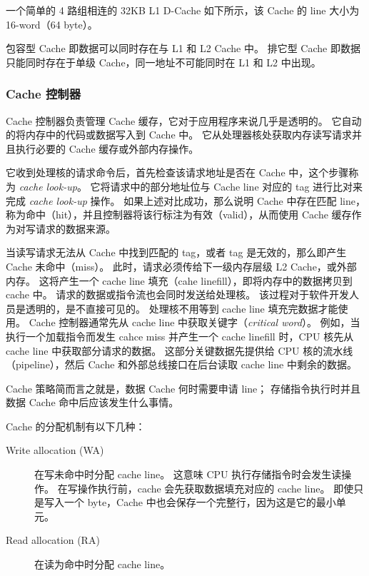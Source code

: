 一个简单的 4 路组相连的 32KB L1 D-Cache 如下所示，该 Cache 的 line 大小为 16-word（64 byte）。



包容型 Cache 即数据可以同时存在与 L1 和 L2 Cache 中。
排它型 Cache 即数据只能同时存在于单级 Cache，同一地址不可能同时在 L1 和 L2 中出现。

\subsubsection{Cache 控制器}

Cache 控制器负责管理 Cache 缓存，它对于应用程序来说几乎是透明的。
它自动的将内存中的代码或数据写入到 Cache 中。
它从处理器核处获取内存读写请求并且执行必要的 Cache 缓存或外部内存操作。

它收到处理核的请求命令后，首先检查该请求地址是否在 Cache 中，这个步骤称为 \textit{cache look-up}。
它将请求中的部分地址位与 Cache line 对应的 tag 进行比对来完成 \textit{cache look-up} 操作。
如果上述对比成功，那么说明 Cache 中存在匹配 line，称为命中（hit），并且控制器将该行标注为有效（valid），从而使用 Cache 缓存作为对写请求的数据来源。

当读写请求无法从 Cache 中找到匹配的 tag，或者 tag 是无效的，那么即产生 Cache 未命中（miss）。
此时，请求必须传给下一级内存层级 L2 Cache，或外部内存。
这将产生一个 cache line 填充（cahe linefill），即将内存中的数据拷贝到 cache 中。
请求的数据或指令流也会同时发送给处理核。
该过程对于软件开发人员是透明的，是不直接可见的。
处理核不用等到 cache line 填充完数据才能使用。
Cache 控制器通常先从 cache line 中获取关键字（\textit{critical word}）。
例如，当执行一个加载指令而发生 cahce miss 并产生一个 cache linefill 时，CPU 核先从 cache line 中获取部分请求的数据。
这部分关键数据先提供给 CPU 核的流水线（pipeline），然后 Cache 和外部总线接口在后台读取 cache line 中剩余的数据。


Cache 策略简而言之就是，数据 Cache 何时需要申请 line；
存储指令执行时并且数据 Cache 命中后应该发生什么事情。

Cache 的分配机制有以下几种：

\begin{description}
  \item[Write allocation (WA)] 在写未命中时分配 cache line。
    这意味 CPU 执行存储指令时会发生读操作。
    在写操作执行前，cache 会先获取数据填充对应的 cache line。
    即使只是写入一个 byte，Cache 中也会保存一个完整行，因为这是它的最小单元。
  
  \item[Read allocation (RA)] 在读为命中时分配 cache line。
\end{description}

